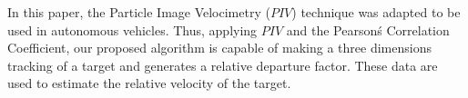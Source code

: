 In this paper, the Particle Image Velocimetry ($PIV$) technique was adapted to be used in autonomous vehicles.
Thus, applying $PIV$ and the Pearson\'s Correlation Coefficient, our proposed algorithm 
is capable of making a three dimensions tracking of a target 
and generates a relative departure factor. These data are used to estimate the 
relative velocity of the target.